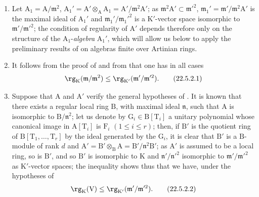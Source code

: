 \begin{remark}[22.5.2]
\label{0.22.5.2}
\begin{enumerate}
  \item[\rm{(i)}] Let $\mathrm{A}_1=\mathrm{A}/\mathfrak{m}^2$, $\mathrm{A}_1'=\mathrm{A}'\otimes_\mathrm{A}\mathrm{A}_1=\mathrm{A}'/\mathfrak{m}^2\mathrm{A}'$; as $\mathfrak{m}^2\mathrm{A}'\subset\mathfrak{m}'^2$, $\mathfrak{m}_1'=\mathfrak{m}'/\mathfrak{m}^2\mathrm{A}'$ is the maximal ideal of $\mathrm{A}_1'$ and $\mathfrak{m}_1'/\mathfrak{m}_1'^2$ is a $\mathrm{K}'$-vector space isomorphic to $\mathfrak{m}'/\mathfrak{m}'^2$; the condition of regularity of $\mathrm{A}'$ depends therefore only on the structure of the $\mathrm{A}_1$-\emph{algebra} $\mathrm{A}_1'$, which will allow us below to apply the preliminary results of  on algebras finite over Artinian rings.
  \item[\rm{(ii)}] It follows from the proof of  and from  that one has in all cases
\[
\label{0.22.5.2.1}
  \rg_\mathrm{K}(\mathfrak{m}/\mathfrak{m}^2)\leq\rg_{\mathrm{K}'}(\mathfrak{m}'/\mathfrak{m}'^2).
  \tag{22.5.2.1}
\]
  \item[\rm{(iii)}] Suppose that $\mathrm{A}$ and $\mathrm{A}'$ verify the general hypotheses of .
  It is known  that there exists a regular local ring $\mathrm{B}$, with maximal ideal $\mathfrak{n}$, such that $\mathrm{A}$ is isomorphic to $\mathrm{B}/\mathfrak{n}^2$; let us denote by $\mathrm{G}_i\in\mathrm{B}[\mathrm{T}_i]$ a unitary polynomial whose canonical image in $\mathrm{A}[\mathrm{T}_i]$ is $\mathrm{F}_i$ $(1\leq i\leq r)$; then, if $\mathrm{B}'$ is the quotient ring of $\mathrm{B}[\mathrm{T}_1,\ldots,\mathrm{T}_r]$ by the ideal generated by the $\mathrm{G}_i$, it is clear that $\mathrm{B}'$ is a $\mathrm{B}$-module of rank $d$ and $\mathrm{A}'=\mathrm{B}'\otimes_\mathrm{B}\mathrm{A}=\mathrm{B}'/\mathfrak{n}^2\mathrm{B}'$; as $\mathrm{A}'$ is assumed to be a local ring, so is $\mathrm{B}'$, and so $\mathrm{B}'$ is isomorphic to $\mathrm{K}$ and $\mathfrak{n}'/\mathfrak{n}'^2$ isomorphic to $\mathfrak{m}'/\mathfrak{m}'^2$ as $\mathrm{K}'$-vector spaces;
  the inequality  shows thus that we have, under the hypotheses of 
\[
\label{0.22.5.2.2}
  \rg_\mathrm{K}(\mathrm{V})\leq\rg_{\mathrm{K}'}(\mathfrak{m}'/\mathfrak{m}'^2).
  \tag{22.5.2.2}
\]
\end{enumerate}
\end{remark}

